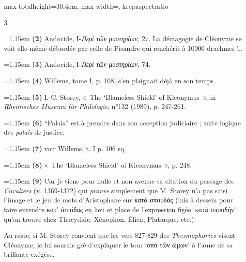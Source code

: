 \documentclass[11pt,twoside]{book}
\newcommand{\italique}[1]{\textit{#1}}
\newcommand{\grec}[1]{{\policeGr #1}}
\begin{document}
\begin{adjustbox}{max totalheight=30.4cm, max width=\textwidth, keepaspectratio}
\begin{minipage}{\textwidth}
{\begin{multicols}{3}
\par\vspace{1.5pt}
\noindent\hangindent=1.15em {\color{sepiaNote}\textbf{(2)}} Andocide, I-\italique{\grec{Περὶ τῶν μυστηρίων}}, 27. La démagogie de Cléonyme se voit elle-même débordée par celle de Pisandre qui renchérit à 10000 drachmes !..
\par\vspace{1.5pt}
\noindent\hangindent=1.15em {\color{sepiaNote}\textbf{(3)}} Andocide, I-\italique{\grec{Περὶ τῶν μυστηρίων}}, 74.
\par\vspace{1.5pt}
\noindent\hangindent=1.15em {\color{sepiaNote}\textbf{(4)}} Willems, tome I, p. 108, s'en plaignait déjà en son temps.
\par\vspace{1.5pt}
\noindent\hangindent=1.15em {\color{sepiaNote}\textbf{(5)}} I. C. Storey, «~The `Blameless Shield' of Kleonymus~», in \italique{Rheinisches Museum für Philologie}, n°132 (1989), p. 247-261.
\par\vspace{1.5pt}
\noindent\hangindent=1.15em {\color{sepiaNote}\textbf{(6)}} ``Palais'' est à prendre dans son acception judiciaire ; suite logique des \italique{palais} de justice.
\par\vspace{1.5pt}
\noindent\hangindent=1.15em {\color{sepiaNote}\textbf{(7)}} voir Willems, t. I p. 106 sq.
\par\vspace{1.5pt}
\noindent\hangindent=1.15em {\color{sepiaNote}\textbf{(8)}} «~The `Blameless Shield' of Kleonymus~», p. 248.
\par\vspace{1.5pt}
\noindent\hangindent=1.15em {\color{sepiaNote}\textbf{(9)}} Car je tiens pour nulle et non avenue sa citation du passage des \italique{Cavaliers} (v. 1369-1372) qui \italique{prouve} simplement que M. Storey n'a pas saisi l'image et le jeu de mots d'Aristophane sur \grec{κατὰ σπουδὰς} (mis à dessein pour faire entendre κατ᾿ ἀσπίδας en lieu et place de l'expression figée `κατὰ σπουδήν' qu'on trouve chez Thucydide, Xénophon, Élien, Plutarque, etc.).
\par\vspace{1.5pt}
\noindent Au reste, si M. Storey convient  que les vers 827-829 des \italique{Thesmophories} visent Cléonyme, je lui saurais gré d'expliquer le tour `ἀπὸ τῶν ὤμων' à l'aune de sa brillante exégèse.

\end{multicols}}
\end{minipage}
\end{adjustbox}
\end{document}
